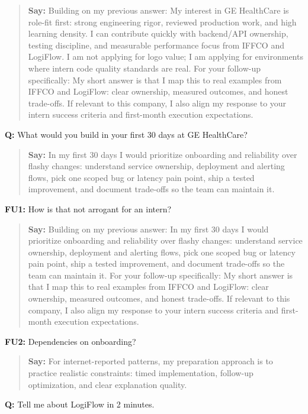 \documentclass[9pt,a4paper]{article}
\begin{document}
\begin{quote}\small\textbf{Say:} Building on my previous answer: My interest in GE HealthCare is role-fit first: strong engineering rigor, reviewed production work, and high learning density. I can contribute quickly with backend/API ownership, testing discipline, and measurable performance focus from IFFCO and LogiFlow. I am not applying for logo value; I am applying for environments where intern code quality standards are real. For your follow-up specifically: My short answer is that I map this to real examples from IFFCO and LogiFlow: clear ownership, measured outcomes, and honest trade-offs. If relevant to this company, I also align my response to your intern success criteria and first-month execution expectations.\end{quote}
\vspace{2mm}
\textbf{Q:} What would you build in your first 30 days at GE HealthCare?

\begin{quote}\small\textbf{Say:} In my first 30 days I would prioritize onboarding and reliability over flashy changes: understand service ownership, deployment and alerting flows, pick one scoped bug or latency pain point, ship a tested improvement, and document trade-offs so the team can maintain it.\end{quote}
\vspace{2mm}
\textbf{FU1:} How is that not arrogant for an intern?

\begin{quote}\small\textbf{Say:} Building on my previous answer: In my first 30 days I would prioritize onboarding and reliability over flashy changes: understand service ownership, deployment and alerting flows, pick one scoped bug or latency pain point, ship a tested improvement, and document trade-offs so the team can maintain it. For your follow-up specifically: My short answer is that I map this to real examples from IFFCO and LogiFlow: clear ownership, measured outcomes, and honest trade-offs. If relevant to this company, I also align my response to your intern success criteria and first-month execution expectations.\end{quote}
\vspace{2mm}
\textbf{FU2:} Dependencies on onboarding?

\begin{quote}\small\textbf{Say:} For internet-reported patterns, my preparation approach is to practice realistic constraints: timed implementation, follow-up optimization, and clear explanation quality.\end{quote}
\vspace{2mm}
\textbf{Q:} Tell me about LogiFlow in 2 minutes.
\end{document}
